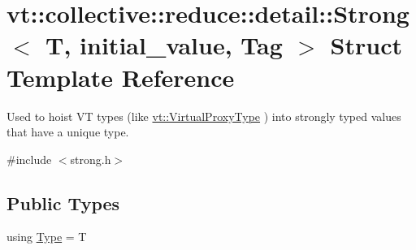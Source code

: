 \hypertarget{structvt_1_1collective_1_1reduce_1_1detail_1_1_strong}{}\section{vt\+:\+:collective\+:\+:reduce\+:\+:detail\+:\+:Strong$<$ T, initial\+\_\+value, Tag $>$ Struct Template Reference}
\label{structvt_1_1collective_1_1reduce_1_1detail_1_1_strong}


Used to hoist VT types (like {\ttfamily \hyperlink{namespacevt_a1b417dd5d684f045bb58a0ede70045ac}{vt\+::\+Virtual\+Proxy\+Type}} ) into strongly typed values that have a unique type.  




{\ttfamily \#include $<$strong.\+h$>$}

\subsection*{Public Types}
\begin{DoxyCompactItemize}
\item 
using \hyperlink{structvt_1_1collective_1_1reduce_1_1detail_1_1_strong_a3a5f24fc84aba0dd94b8d2dee9598a92}{Type} = T
\end{DoxyCompactItemize}
